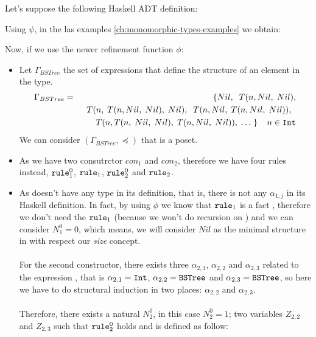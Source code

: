 	\begin{example}
		Let's suppose the following Haskell ADT definition:
		
		Using $\psi$, in the las examples \ref{ch:monomorphic-types-examples} we obtain:
		
		Now, if we use the newer refinement function $\phi$:
		\begin{itemize}
			\item Let $\Gamma_{BSTree}$ the set of expressions that define the structure of an element in the  type.
			      \begin{eqnarray*}
			      	\Gamma_{BSTree} & = & \{ Nil, \;\; T(n, Nil, \; Nil), \\
			      	&& \;\; T(n, \; T(n, Nil, \; Nil), \; Nil), \;\; T(n, Nil, \; T(n, Nil, \; Nil)), \;\;  \\
			      	&& \;\; T(n, T(n, \; Nil, \; Nil), \; T(n, Nil, \; Nil)), \; \ldots \; \} \;\; \;\; n \in \texttt{Int}
			      \end{eqnarray*}
			      We can consider $(\Gamma_{BSTree}, \preceq)$ that is a poset.
			\item As we have two consutrctor $con_1$ and $con_2$, therefore we have four rules instead, $\texttt{rule}_{1}^{0}$, $\texttt{rule}_1$, $\texttt{rule}_{2}^{0}$ and $\texttt{rule}_2$.
			\item As  doesn't have any type in its definition, that is, there is not any $\alpha_{1,j}$ in its Haskell definition. In fact, by using $\phi$ we know that $\texttt{rule}_1$ is a fact , therefore we don't need the $\texttt{rule}_1$ (because we won't do recursion on ) and we can consider $N_{1}^{0} = 0$, which means, we will consider $Nil$ as the minimal structure in  with respect our \textit{size} concept.\\\\
			      For the second constructor, there exists three $\alpha_{2,1}$, $\alpha_{2,2}$ and $\alpha_{2,3}$ related to the expression , that is $\alpha_{2,1} = \texttt{Int}$, $\alpha_{2,2} = \texttt{BSTree}$ and $\alpha_{2,3} = \texttt{BSTree}$, so here we have to do structural induction in two places: $\alpha_{2,2}$ and $\alpha_{2,3}$.\\\\
			      Therefore, there exists a natural $N_{2}^{0}$, in this case $N_{2}^{0} = 1$; two variables $Z_{2,2}$ and $Z_{2,3}$ such that $\texttt{rule}_{2}^{0}$ holds and is defined as follow:

\end{itemize}
\end{example}
